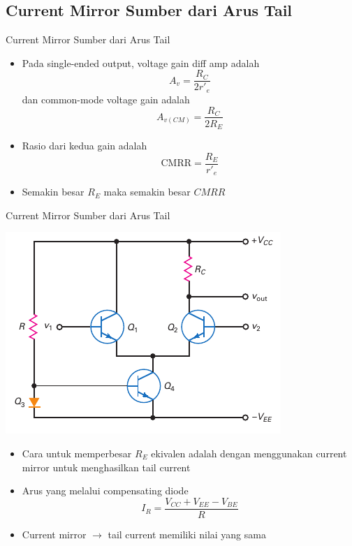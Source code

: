 \documentclass[aspectratio=169]{beamer}
\begin{document}
\subsection{Current Mirror Sumber dari Arus Tail}
\begin{frame}{Current Mirror Sumber dari Arus Tail}
	\begin{itemize}
		\item Pada single-ended output, voltage gain diff amp adalah
		\[ A_v = \frac{R_C}{2 r'_e} \] dan common-mode voltage gain adalah
		\[ A_{v(CM)} = \frac{R_C}{2R_E} \]
		\item Rasio dari kedua gain adalah
		\[ \text{CMRR} = \frac{R_E}{r'_e} \]
		\item Semakin besar $ R_E $ maka semakin besar $ CMRR $
	\end{itemize}
\end{frame}

\begin{frame}{Current Mirror Sumber dari Arus Tail}
	\begin{multicols}{2}
		\begin{center}
			\includegraphics[height=0.6\textheight]{gambar/01.fig29}
		\end{center}
		\columnbreak
		\begin{itemize}
			\item Cara untuk memperbesar $ R_E $ ekivalen adalah dengan menggunakan current mirror untuk menghasilkan tail current
			\item Arus yang melalui compensating diode
			\begin{equation}\label{pers.25}
				I_R = \frac{V_{CC} + V_{EE} - V_{BE}}{R}
			\end{equation}
			\item Current mirror $\rightarrow$ tail current memiliki nilai yang sama
		\end{itemize}
	\end{multicols}
\end{frame}
\end{document}
